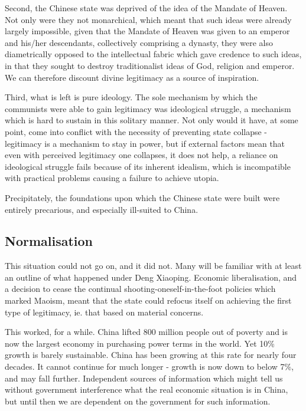 \documentclass[10pt,a4paper,twocolumn]{article}
\newcounter{count}
\begin{document}
Second, the Chinese state was deprived of the idea of the Mandate of Heaven. Not only were they not monarchical, which meant that such ideas were already largely impossible, given that the Mandate of Heaven was given to an emperor and his/her descendants, collectively comprising a dynasty, they were also diametrically opposed to the intellectual fabric which gave credence to such ideas, in that they sought to destroy traditionalist ideas of God, religion and emperor. We can therefore discount divine legitimacy as a source of inspiration.

Third, what is left is pure ideology. The sole mechanism by which the communists were able to gain legitimacy was ideological struggle, a mechanism which is hard to sustain in this solitary manner. Not only would it have, at some point, come into conflict with the necessity of preventing state collapse - legitimacy is a mechanism to stay in power, but if external factors mean that even with perceived legitimacy one collapses, it does not help, a reliance on ideological struggle fails because of its inherent idealism, which is incompatible with practical problems causing a failure to achieve utopia.

Precipitately, the foundations upon which the Chinese state were built were entirely precarious, and especially ill-suited to China.

\subsection{Normalisation}

This situation could not go on, and it did not. Many will be familiar with at least an outline of what happened under Deng Xiaoping. Economic liberalisation, and a decision to cease the continual shooting-oneself-in-the-foot policies which marked Maoism, meant that the state could refocus itself on achieving the first type of legitimacy, ie. that based on material concerns.

This worked, for a while. China lifted 800 million people out of poverty and is now the largest economy in purchasing power terms in the world. Yet 10\% growth is barely sustainable. China has been growing at this rate for nearly four decades. It cannot continue for much longer - growth is now down to below 7\%, and may fall further. Independent sources of information which might tell us without government interference what the real economic situation is in China, but until then we are dependent on the government for such information.
\end{document}

